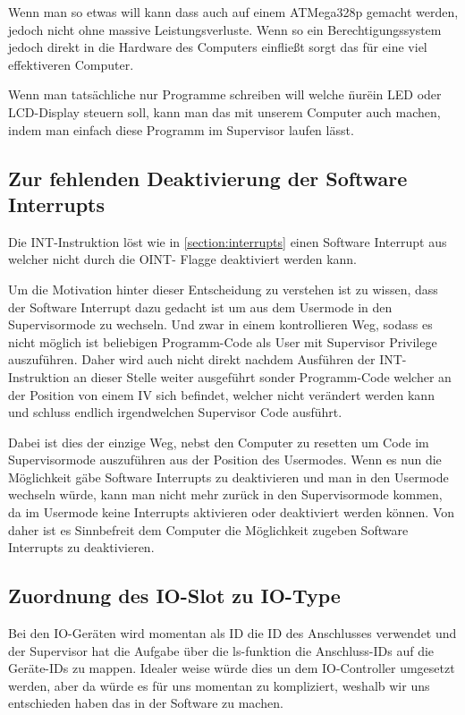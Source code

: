 \documentclass{scrartcl}
\begin{document}
Wenn man so etwas will kann dass auch auf einem ATMega328p gemacht werden, jedoch nicht ohne massive Leistungsverluste.
Wenn so ein Berechtigungssystem jedoch direkt in die Hardware des Computers einfließt sorgt das für eine viel effektiveren Computer.

Wenn man tatsächliche nur Programme schreiben will welche \"nur\" ein LED oder LCD-Display steuern soll, kann man das mit unserem Computer auch machen, indem man einfach diese Programm im Supervisor laufen lässt.

\subsection{\label{com:SoftwareInterrupt}Zur fehlenden Deaktivierung der Software Interrupts}

Die INT-Instruktion löst wie in \autoref{section:interrupts} einen Software Interrupt aus welcher nicht durch die OINT- Flagge deaktiviert werden kann.

Um die Motivation hinter dieser Entscheidung zu verstehen ist zu wissen, dass der Software Interrupt dazu gedacht ist um aus dem Usermode in den Supervisormode zu wechseln.
Und zwar in einem kontrollieren Weg, sodass es nicht möglich ist beliebigen Programm-Code als User mit Supervisor Privilege auszuführen.
Daher wird auch nicht direkt nachdem Ausführen der INT-Instruktion an dieser Stelle weiter ausgeführt sonder Programm-Code welcher an der Position von einem IV sich befindet, welcher nicht verändert werden kann und schluss endlich irgendwelchen Supervisor Code ausführt.

Dabei ist dies der einzige Weg, nebst den Computer zu resetten um Code im Supervisormode auszuführen aus der Position des Usermodes.
Wenn es nun die Möglichkeit gäbe Software Interrupts zu deaktivieren und man in den Usermode wechseln würde, kann man nicht mehr zurück in den Supervisormode kommen, da im Usermode keine Interrupts aktivieren oder deaktiviert werden können.
Von daher ist es Sinnbefreit dem Computer die Möglichkeit zugeben Software Interrupts zu deaktivieren.

\subsection{\label{com:} Zuordnung des IO-Slot zu IO-Type}

Bei den IO-Geräten wird momentan als ID die ID des Anschlusses verwendet und der Supervisor hat die Aufgabe über die ls-funktion die Anschluss-IDs auf die Geräte-IDs zu mappen.
Idealer weise würde dies un dem IO-Controller umgesetzt werden, aber da würde es für uns momentan zu kompliziert, weshalb wir uns entschieden haben das in der Software zu machen.

\printbibliography{}
\end{document}
